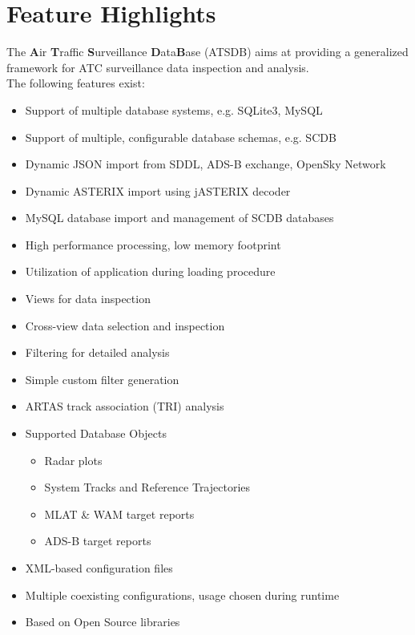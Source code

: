 \section{Feature Highlights}

The \textbf{A}ir \textbf{T}raffic \textbf{S}urveillance \textbf{D}ata\textbf{B}ase (ATSDB) aims at providing a generalized framework for ATC surveillance data inspection and analysis. \\

The following features exist: \\

\begin{itemize}  
\item Support of multiple database systems, e.g. SQLite3, MySQL
\item Support of multiple, configurable database schemas, e.g. SCDB
\item Dynamic JSON import from SDDL, ADS-B exchange, OpenSky Network
\item Dynamic ASTERIX import using jASTERIX decoder
\item MySQL database import and management of SCDB databases
\item High performance processing, low memory footprint
\item Utilization of application during loading procedure
\item Views for data inspection
\item Cross-view data selection and inspection
\item Filtering for detailed analysis
\item Simple custom filter generation
\item ARTAS track association (TRI) analysis
\item Supported Database Objects
\begin{itemize}  
\item Radar plots
\item System Tracks and Reference Trajectories
\item MLAT \& WAM target reports
\item ADS-B target reports
\end{itemize}
\item XML-based configuration files
\item Multiple coexisting configurations, usage chosen during runtime
\item Based on Open Source libraries
\end{itemize} 
